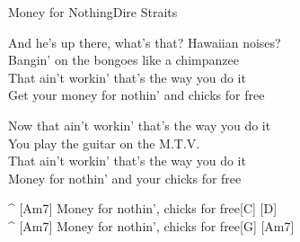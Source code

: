\begin{song}{Money for Nothing}{Dire Straits}
\begin{guitar}
And he's up there, what's that?  Hawaiian noises?\\
Bangin' on the bongoes like a chimpanzee\\
That ain't workin' that's the way you do it\\
Get your money for nothin' and chicks for free\\
\end{guitar}


\begin{guitar}
Now that ain't workin' that's the way you do it\\
You play the guitar on the M.T.V.\\
That ain't workin' that's the way you do it\\
Money for nothin' and your chicks for free\\
\end{guitar}

\begin{guitar}
^ [Am7] Money for nothin', chicks for free[C] [D]\\
^ [Am7] Money for nothin', chicks for free[G]   [Am7]   \\
\end{guitar}
\end{song}
